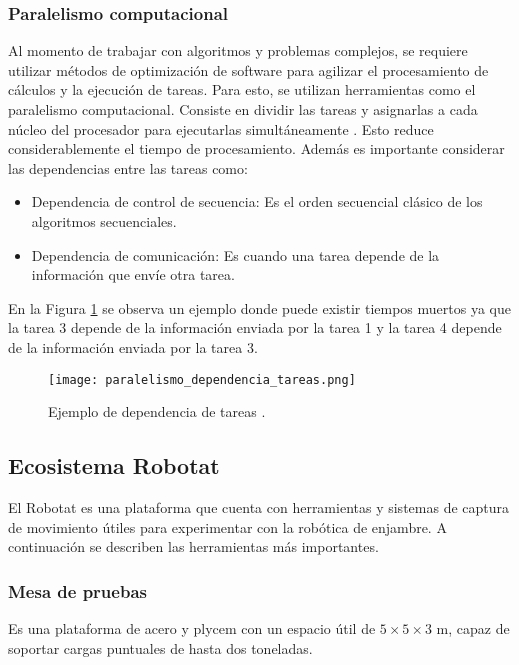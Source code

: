 \subsubsection*{Paralelismo computacional}
Al momento de trabajar con algoritmos y problemas complejos, se requiere utilizar métodos de optimización de software para agilizar el procesamiento de cálculos y la ejecución de tareas. 
Para esto, se utilizan herramientas como el paralelismo computacional. Consiste en dividir las tareas y asignarlas a cada núcleo del procesador para ejecutarlas simultáneamente \cite{libro_paralelismo}. Esto reduce considerablemente el tiempo de procesamiento. Además es importante considerar las dependencias entre las tareas como:

\begin{itemize}
	\item Dependencia de control de secuencia: Es el orden secuencial clásico de los algoritmos secuenciales.
	\item Dependencia de comunicación: Es cuando una tarea depende de la información que envíe otra tarea.
\end{itemize}

En la Figura \ref{fig:paralelismo_dependencia_tareas} se observa un ejemplo donde puede existir tiempos muertos ya que la tarea 3 depende de la información enviada por la tarea 1 y la tarea 4 depende de la información enviada por la tarea 3.
 \begin{figure}[H]
	\centering
	\texttt{[image: paralelismo\_dependencia\_tareas.png]}
	\caption{Ejemplo de dependencia de tareas \cite{libro_paralelismo}.}
	\label{fig:paralelismo_dependencia_tareas}
\end{figure}

\subsection*{Ecosistema Robotat}
El Robotat es una plataforma que cuenta con herramientas y sistemas de captura de movimiento útiles para experimentar con la robótica de enjambre. A continuación se describen las herramientas más importantes.

\subsubsection*{Mesa de pruebas}
Es una plataforma de acero y plycem con un espacio útil de $5 \times 5 \times 3$ m, capaz de soportar cargas puntuales de hasta dos toneladas. 

